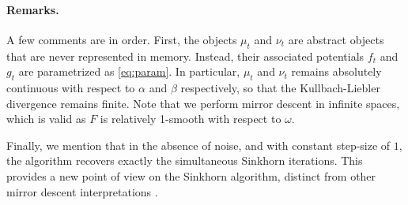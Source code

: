\paragraph{Remarks.} A few comments are in order. First, the objects $\mu_t$
and $\nu_t$ are abstract objects that are never represented in memory. Instead,
their associated potentials $f_t$ and $g_t$ are parametrized as
\eqref{eq:param}. In particular, $\mu_t$ and $\nu_t$ remains absolutely
continuous with respect to $\alpha$ and $\beta$ respectively, so that the
Kullbach-Liebler divergence remains finite. Note that we perform mirror descent
in infinite spaces, which is valid as $F$ is relatively 1-smooth with respect to
$\omega$.

Finally, we mention that in the absence of noise, and with constant step-size of
$1$, the algorithm recovers exactly the simultaneous Sinkhorn iterations. This
provides a new point of view on the Sinkhorn algorithm, distinct from other
mirror descent interpretations \citep{}. 




















